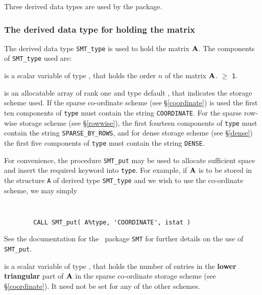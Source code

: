 \documentclass{galahad}
\begin{document}




\galtypes
Three derived data types are used by the package.


\subsubsection{The derived data type for holding the matrix}\label{typeprob}
The derived data type {\tt SMT\_type} is used to hold the matrix ${\mathbf{A}}$.
The components of {\tt SMT\_type} used are:

\begin{description}

 is a scalar variable of type \integer, that holds
the order $n$ of the matrix  ${\mathbf{A}}$.
 $\geq$ {\tt 1}.

 is an allocatable array of rank one and type default \character, that
indicates the storage scheme used. If the
sparse co-ordinate scheme (see \S\ref{coordinate}) is used
the first ten components of {\tt type} must contain the
string {\tt COORDINATE}.
For the sparse row-wise storage scheme (see \S\ref{rowwise}),
the first fourteen components of {\tt type} must contain the
string {\tt SPARSE\_BY\_ROWS}, and
for dense storage scheme (see \S\ref{dense})
the first five components of {\tt type} must contain the
string {\tt DENSE}.

For convenience, the procedure {\tt SMT\_put}
may be used to allocate sufficient space and insert the required keyword
into {\tt type}.
For example, if ${\mathbf{A}}$ is to be stored in the structure {\tt A}
of derived type {\tt SMT\_type} and we wish to use
the co-ordinate scheme, we may simply
{\tt
\begin{verbatim}
        CALL SMT_put( A%type, 'COORDINATE', istat )
\end{verbatim}
}
\noindent
See the documentation for the \galahad\ package {\tt SMT}
for further details on the use of {\tt SMT\_put}.

 is a scalar variable of type \integer, that
holds the number of entries in the {\bf lower triangular} part of ${\mathbf{A}}$
in the sparse co-ordinate storage scheme (see \S\ref{coordinate}).
It need not be set for any of the other schemes.


\end{description}
\end{document}
